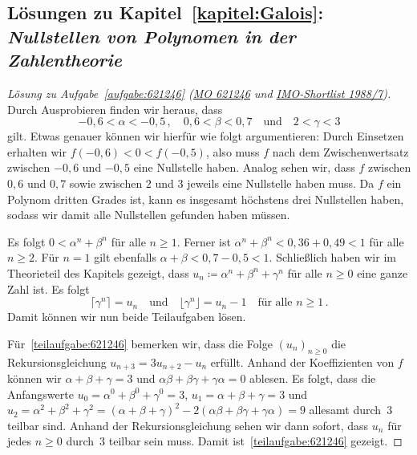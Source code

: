 \subsection*{Lösungen zu Kapitel~\ref{kapitel:Galois}: \emph{Nullstellen von Polynomen in der Zahlentheorie}}

\begin{proof}[Lösung zu Aufgabe~\ref{aufgabe:621246} \textmd{(\href{https://www.mathematik-olympiaden.de/moev/index.php?option=com_download&thema=a&datei=A62124b.pdf&format=raw}{MO 621246} und \href{https://artofproblemsolving.com/community/c3939_1988_imo_shortlist}{IMO-Shortlist 1988/7})}]
	Durch Ausprobieren finden wir heraus, dass
	\begin{equation*}
		-0{,}6<\alpha<-0{,}5\,,\quad 0{,}6<\beta<0{,}7\quad\text{und}\quad 2<\gamma <3
	\end{equation*}
	gilt. Etwas genauer können wir hierfür wie folgt argumentieren: Durch Einsetzen erhalten wir $f(-0{,}6)<0<f(-0{,}5)$, also muss $f$ nach dem Zwischenwertsatz zwischen $-0{,}6$ und $-0{,}5$ eine Nullstelle haben. Analog sehen wir, dass $f$ zwischen $0{,}6$ und $0{,}7$ sowie zwischen $2$ und $3$ jeweils eine Nullstelle haben muss. Da $f$ ein Polynom dritten Grades ist, kann es insgesamt höchstens drei Nullstellen haben, sodass wir damit alle Nullstellen gefunden haben müssen.
	
	Es folgt $0<\alpha^n+\beta^n$ für alle $n\geqslant 1$. Ferner ist $\alpha^n+\beta^n<0{,}36+0{,}49<1$ für alle $n\geqslant 2$. Für $n=1$ gilt ebenfalls $\alpha+\beta <0{,7} -0{,}5<1$. Schließlich haben wir im Theorieteil des Kapitels gezeigt, dass $u_n\coloneqq \alpha^n+\beta^n+\gamma^n$ für alle $n\geqslant 0$ eine ganze Zahl ist. Es folgt
	\begin{equation*}
		\lceil \gamma^n\rceil=u_n\quad\text{und}\quad\lfloor \gamma^n\rfloor =u_n-1\quad \text{für alle }n\geqslant 1\,.
	\end{equation*}
	Damit können wir nun beide Teilaufgaben lösen.
	
	Für~\ref{teilaufgabe:621246} bemerken wir, dass die Folge $(u_n)_{n\geqslant 0}$ die Rekursionsgleichung $u_{n+3}=3u_{n+2}-u_n$ erfüllt. Anhand der Koeffizienten von $f$ können wir $\alpha+\beta+\gamma=3$ und $\alpha\beta+\beta\gamma+\gamma\alpha=0$ ablesen. Es folgt, dass die Anfangswerte $u_0=\alpha^0+\beta^0+\gamma^0=3$, $u_1=\alpha+\beta+\gamma=3$ und $u_2=\alpha^2+\beta^2+\gamma^2=(\alpha+\beta+\gamma)^2-2(\alpha\beta+\beta\gamma+\gamma\alpha)=9$ allesamt durch~$3$ teilbar sind. Anhand der Rekursionsgleichung sehen wir dann sofort, dass $u_n$ für jedes $n\geqslant 0$ durch~$3$ teilbar sein muss. Damit ist~\ref{teilaufgabe:621246} gezeigt.
	

\end{proof}
